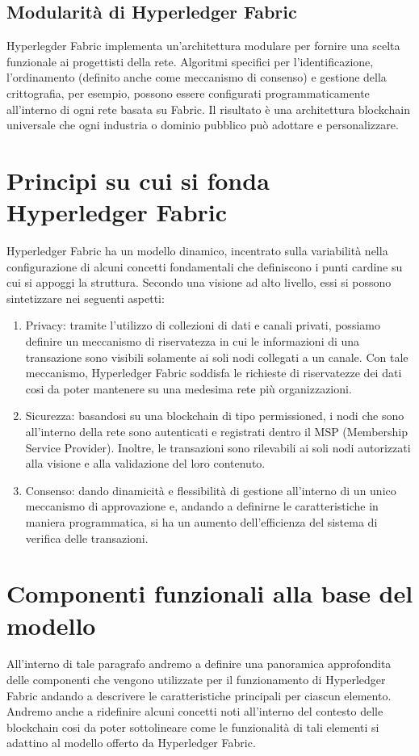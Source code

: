 \subsection{Modularità di Hyperledger Fabric}
Hyperlegder Fabric implementa un’architettura modulare per fornire una scelta funzionale ai progettisti della rete. Algoritmi specifici per l'identificazione, l'ordinamento (definito anche come meccanismo di consenso) e gestione della crittografia, per esempio, possono essere configurati programmaticamente all'interno di ogni rete basata su Fabric. Il risultato è una architettura blockchain universale che ogni industria o dominio pubblico può adottare e personalizzare.
\newpage
\section{Principi su cui si fonda Hyperledger Fabric}
Hyperledger Fabric ha un modello dinamico, incentrato sulla variabilità nella configurazione di alcuni concetti fondamentali che definiscono i punti cardine su cui si appoggi la struttura. Secondo una visione ad alto livello, essi si possono sintetizzare nei seguenti aspetti:
\begin{enumerate}
    \item Privacy: tramite l'utilizzo di collezioni di dati e canali privati, possiamo definire un meccanismo di riservatezza in cui le informazioni di una transazione sono visibili solamente ai soli nodi collegati a un canale. Con tale meccanismo, Hyperledger Fabric soddisfa le richieste di riservatezze dei dati cosi da poter mantenere su una medesima rete più organizzazioni.
    \item Sicurezza: basandosi su una blockchain di tipo permissioned, i nodi che sono all'interno della rete sono autenticati e registrati dentro il MSP (Membership Service Provider). Inoltre, le transazioni sono rilevabili ai soli nodi autorizzati alla visione e alla validazione del loro contenuto.
    \item Consenso: dando dinamicità e flessibilità di gestione all'interno di un unico meccanismo di approvazione e, andando a definirne le caratteristiche in maniera programmatica, si ha un aumento dell'efficienza del sistema di verifica delle transazioni.
\end{enumerate}
\newpage
\section{Componenti funzionali alla base del modello}
All'interno di tale paragrafo andremo a definire una panoramica approfondita delle componenti che vengono utilizzate per il funzionamento di Hyperledger Fabric andando a descrivere le caratteristiche principali per ciascun elemento. Andremo anche a ridefinire alcuni concetti noti all'interno del contesto delle blockchain cosi da poter sottolineare come le funzionalità di tali elementi si adattino al modello offerto da Hyperledger Fabric.
